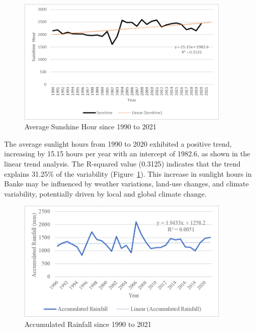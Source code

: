 \begin{figure}[H]
    \centering
    \caption{Average Sunshine Hour since 1990 to 2021} 
    \label{fig:trend_avg_sunshine_hour}
    \includegraphics[width=0.9\textwidth]{images/trend_avg_sunshine_hour.png}
\end{figure}

The average sunlight hours from 1990 to 2020 exhibited a positive trend, increasing by 15.15 hours per year with an intercept of 1982.6, as shown in the linear trend analysis. The R-squared value (0.3125) indicates that the trend explains 31.25\% of the variability (Figure~\ref{fig:trend_avg_sunshine_hour}). This increase in sunlight hours in Banke may be influenced by weather variations, land-use changes, and climate variability, potentially driven by local and global climate change.


\begin{figure}[H]
    \centering
    \caption{Accumulated Rainfall since 1990 to 2021} 
    \label{fig:trend_accumulated_rainfall}
    \includegraphics[width=0.9\textwidth]{images/trend_accumulated_rainfall.png}
\end{figure}



